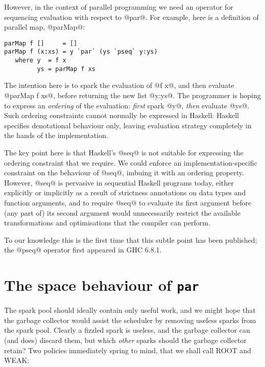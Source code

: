 \documentclass[twocolumn,9pt]{sigplanconf}
\begin{document}
However, in the context of parallel programming we need an operator
for sequencing evaluation with respect to @par@.  For example, here is
a definition of parallel map, @parMap@:

\begin{verbatim}
parMap f []     = []
parMap f (x:xs) = y `par` (ys `pseq` y:ys)
   where y  = f x
         ys = parMap f xs
\end{verbatim}
The intention here is to spark the evaluation of @f x@, and then
evaluate @parMap f xs@, before returning the new list @y:ys@.  The
programmer is hoping to express an \emph{ordering} of the evaluation:
\emph{first} spark @y@, \emph{then} evaluate @ys@.  Such ordering
constraints cannot normally be expressed in Haskell: Haskell specifies
denotational behaviour only, leaving evaluation strategy completely in
the hands of the implementation.

The key point here is that Haskell's @seq@ is not suitable for
expressing the ordering constraint that we require.  We could enforce an
implementation-specific constraint on the behaviour of @seq@, imbuing
it with an ordering property.  However, @seq@ is pervasive in
sequential Haskell programs today, either explicitly or implicitly as
a result of strictness annotations on data types and function
arguments, and to require @seq@ to evaluate its first argument before
(any part of) its second argument would unnecessarily restrict the
available transformations and optimisations that the compiler can
perform.


To our knowledge this is the first time that this subtle point has
been published; the @pseq@ operator first appeared in GHC 6.8.1.

\section{The space behaviour of \texttt{par}}
\label{s:space-par}

The spark pool should ideally contain only useful work,
and we might hope that the garbage collector would assist the 
scheduler by removing useless sparks from the spark pool.
Clearly a fizzled spark is useless, and the garbage collector
can (and does) discard them, but which \emph{other} 
sparks should the garbage collector retain?  Two policies
immediately spring to mind, that we shall call ROOT and WEAK:
\end{document}
